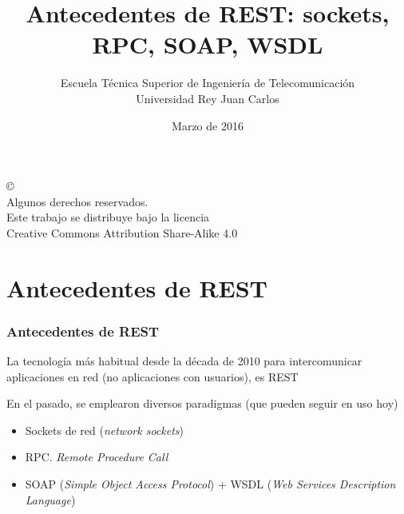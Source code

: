 \documentclass[ucs]{beamer}
\begin{document}
\title[Antecedentes de REST]{Antecedentes de REST: sockets, RPC, SOAP, WSDL}
\author[GSyC]{Escuela Técnica Superior de Ingeniería de Telecomunicación\\
Universidad Rey Juan Carlos}
\date[2016]{Marzo de 2016}


\begin{frame}
  \titlepage
\end{frame}



\begin{frame}[b]
\begin{flushright}
{\tiny
\copyright \insertshortdate~\insertshortauthor \\
  Algunos derechos reservados. \\
  Este trabajo se distribuye bajo la licencia \\
  Creative Commons Attribution Share-Alike 4.0\\
}
\end{flushright}  
\end{frame}









\section{Antecedentes de REST}

\begin{frame}[fragile]
\frametitle{Antecedentes de REST}
La tecnología más habitual desde la década de 2010 para
intercomunicar aplicaciones en red (no aplicaciones con usuarios),
es REST

En el pasado, se emplearon diversos paradigmas
(que pueden seguir en uso hoy)
\begin{itemize}
\item
Sockets de red (\emph{network sockets})
\item
RPC. \emph{Remote Procedure Call}
\item
SOAP (\emph{Simple Object Access Protocol}) +
 WSDL (\emph{Web Services Description Language})
\end{itemize}

\end{frame}
\end{document}
